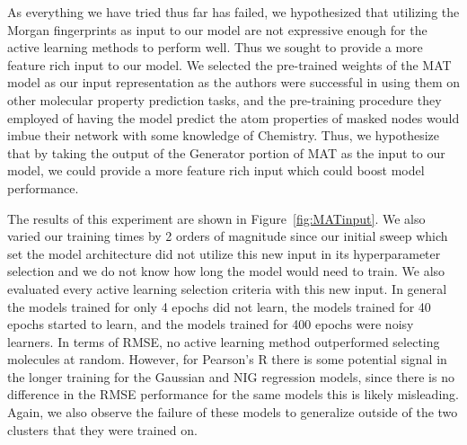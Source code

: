 \documentclass[journal=jmcmar,manuscript=article]{achemso}
\begin{document}
As everything we have tried thus far has failed, we hypothesized that utilizing the Morgan fingerprints as input to our model are not expressive enough for the active learning methods to perform well. Thus we sought to provide a more feature rich input to our model. We selected the pre-trained weights of the MAT\cite{MAT} model as our input representation as the authors were successful in using them on other molecular property prediction tasks, and the pre-training procedure they employed of having the model predict the atom properties of masked nodes would imbue their network with some knowledge of Chemistry. Thus, we hypothesize that by taking the output of the Generator portion of MAT as the input to our model, we could provide a more feature rich input which could boost model performance.

The results of this experiment are shown in Figure~\ref{fig:MATinput}. We also varied our training times by 2 orders of magnitude since our initial sweep which set the model architecture did not utilize this new input in its hyperparameter selection and we do not know how long the model would need to train. We also evaluated every active learning selection criteria with this new input. In general the models trained for only 4 epochs did not learn, the models trained for 40 epochs started to learn, and the models trained for 400 epochs were noisy learners. In terms of RMSE, no active learning method outperformed selecting molecules at random. However, for Pearson's R there is some potential signal in the longer training for the Gaussian and NIG regression models, since there is no difference in the RMSE performance for the same models this is likely misleading. Again, we also observe the failure of these models to generalize outside of the two clusters that they were trained on.
\end{document}
